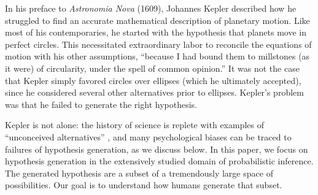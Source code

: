 In his preface to \emph{Astronomia Nova} (1609), Johannes Kepler described how he struggled to find an accurate mathematical description of planetary motion. Like most of his contemporaries, he started with the hypothesis that planets move in perfect circles. This necessitated extraordinary labor to reconcile the equations of motion with his other assumptions, ``because I had bound them to millstones (as it were) of circularity, under the spell of common opinion.'' It was not the case that Kepler simply favored circles over ellipses (which he ultimately accepted), since he considered several other alternatives prior to ellipses. Kepler's problem was that he failed to generate the right hypothesis.


Kepler is not alone: the history of science is replete with examples of ``unconceived alternatives'' \citep{stanford10}, and many psychological biases can be traced to failures of hypothesis generation, as we discuss below. In this paper, we focus on hypothesis generation in the extensively studied domain of probabilistic inference. The generated hypothesis are a subset of a tremendously large space of possibilities. Our goal is to understand how humans generate that subset.

